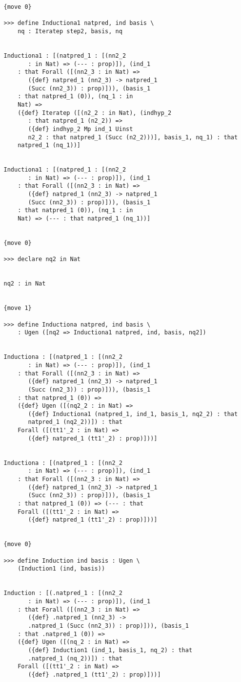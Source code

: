 \documentclass[12pt]{article}
\begin{document}
\begin{verbatim}
   {move 0}

   >>> define Inductiona1 natpred, ind basis \
       nq : Iteratep step2, basis, nq


   Inductiona1 : [(natpred_1 : [(nn2_2 
          : in Nat) => (--- : prop)]), (ind_1 
       : that Forall ([(nn2_3 : in Nat) => 
          ({def} natpred_1 (nn2_3) -> natpred_1 
          (Succ (nn2_3)) : prop)])), (basis_1 
       : that natpred_1 (0)), (nq_1 : in 
       Nat) => 
       ({def} Iteratep ([(n2_2 : in Nat), (indhyp_2 
          : that natpred_1 (n2_2)) => 
          ({def} indhyp_2 Mp ind_1 Uinst 
          n2_2 : that natpred_1 (Succ (n2_2)))], basis_1, nq_1) : that 
       natpred_1 (nq_1))]


   Inductiona1 : [(natpred_1 : [(nn2_2 
          : in Nat) => (--- : prop)]), (ind_1 
       : that Forall ([(nn2_3 : in Nat) => 
          ({def} natpred_1 (nn2_3) -> natpred_1 
          (Succ (nn2_3)) : prop)])), (basis_1 
       : that natpred_1 (0)), (nq_1 : in 
       Nat) => (--- : that natpred_1 (nq_1))]


   {move 0}

   >>> declare nq2 in Nat


   nq2 : in Nat


   {move 1}

   >>> define Inductiona natpred, ind basis \
       : Ugen ([nq2 => Inductiona1 natpred, ind, basis, nq2])


   Inductiona : [(natpred_1 : [(nn2_2 
          : in Nat) => (--- : prop)]), (ind_1 
       : that Forall ([(nn2_3 : in Nat) => 
          ({def} natpred_1 (nn2_3) -> natpred_1 
          (Succ (nn2_3)) : prop)])), (basis_1 
       : that natpred_1 (0)) => 
       ({def} Ugen ([(nq2_2 : in Nat) => 
          ({def} Inductiona1 (natpred_1, ind_1, basis_1, nq2_2) : that 
          natpred_1 (nq2_2))]) : that 
       Forall ([(tt1'_2 : in Nat) => 
          ({def} natpred_1 (tt1'_2) : prop)]))]


   Inductiona : [(natpred_1 : [(nn2_2 
          : in Nat) => (--- : prop)]), (ind_1 
       : that Forall ([(nn2_3 : in Nat) => 
          ({def} natpred_1 (nn2_3) -> natpred_1 
          (Succ (nn2_3)) : prop)])), (basis_1 
       : that natpred_1 (0)) => (--- : that 
       Forall ([(tt1'_2 : in Nat) => 
          ({def} natpred_1 (tt1'_2) : prop)]))]


   {move 0}

   >>> define Induction ind basis : Ugen \
       (Induction1 (ind, basis))


   Induction : [(.natpred_1 : [(nn2_2 
          : in Nat) => (--- : prop)]), (ind_1 
       : that Forall ([(nn2_3 : in Nat) => 
          ({def} .natpred_1 (nn2_3) -> 
          .natpred_1 (Succ (nn2_3)) : prop)])), (basis_1 
       : that .natpred_1 (0)) => 
       ({def} Ugen ([(nq_2 : in Nat) => 
          ({def} Induction1 (ind_1, basis_1, nq_2) : that 
          .natpred_1 (nq_2))]) : that 
       Forall ([(tt1'_2 : in Nat) => 
          ({def} .natpred_1 (tt1'_2) : prop)]))]



\end{verbatim}
\end{document}
